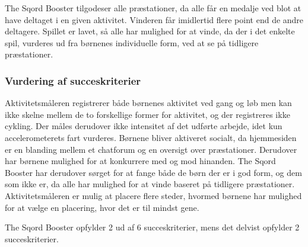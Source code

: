 The Sqord Booster tilgodeser alle præstationer, da alle får en medalje ved blot at have deltaget i en given aktivitet. Vinderen får imidlertid flere point end de andre deltagere. Spillet er lavet, så alle har mulighed for at vinde, da der i det enkelte spil, vurderes ud fra børnenes individuelle form, ved at se på tidligere præstationer. \citep{Sqord_family2015}

\subsubsection{Vurdering af succeskriterier}
Aktivitetsmåleren registrerer både børnenes aktivitet ved gang og løb men kan ikke skelne mellem de to forskellige former for aktivitet, og der registreres ikke cykling. Der måles derudover ikke intensitet af det udførte arbejde, idet kun accelerometerets fart vurderes. \newline
Børnene bliver aktiveret socialt, da hjemmesiden er en blanding mellem et chatforum og en oversigt over præstationer. Derudover har børnene mulighed for at konkurrere med og mod hinanden. The Sqord Booster har derudover sørget for at fange både de børn der er i god form, og dem som ikke er, da alle har mulighed for at vinde baseret på tidligere præstationer. Aktivitetsmåleren er mulig at placere flere steder, hvormed børnene har mulighed for at vælge en placering, hvor det er til mindst gene.

The Sqord Booster opfylder 2 ud af 6 succeskriterier, mens det delvist opfylder 2 succeskriterier.


